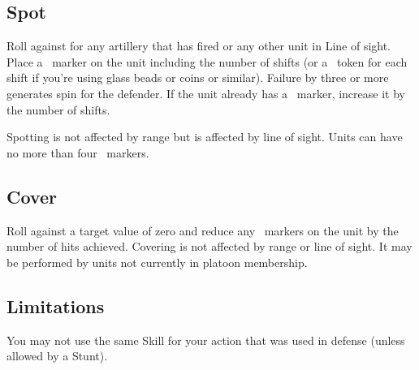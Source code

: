 \subsection{Spot}\label{sec:platoon-combat-spot}

Roll  against  for any artillery that has fired or any other unit in Line of sight. Place a \SPOTTED\ marker on the unit including the number of shifts (or a \SPOTTED\ token for each shift if you're using glass beads or coins or similar). Failure by three or more generates spin for the defender. If the unit already has a \SPOTTED\ marker, increase it by the number of shifts.

Spotting is not affected by range but is affected by line of sight. Units can have no more than four \SPOTTED\ markers.

\subsection{Cover}\label{sec:platoon-combat-cover}

Roll  against a target value of zero and reduce any \SPOTTED\ markers on the unit by the number of hits achieved. Covering is not affected by range or line of sight. It may be performed by units not currently in platoon membership.

\subsection{Limitations}\label{sec:platoon-combat-limitations}

You may not use the same Skill for your action that was used in defense (unless allowed by a Stunt).

